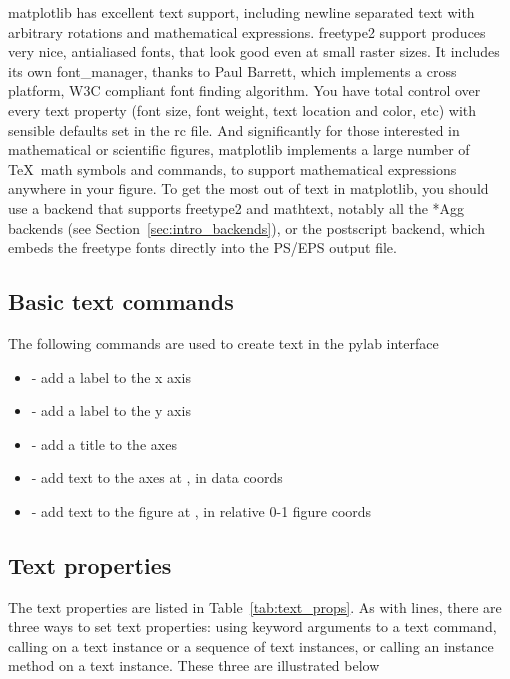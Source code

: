\documentclass[twoside]{book}
\begin{document}
matplotlib has excellent text support, including newline separated
text with arbitrary rotations and mathematical expressions.  freetype2
support produces very nice, antialiased fonts, that look good even at
small raster sizes.  It includes its own font\_manager, thanks to Paul
Barrett, which implements a cross platform, W3C compliant font finding
algorithm.  You have total control over every text property (font
size, font weight, text location and color, etc) with sensible
defaults set in the rc file.  And significantly for those interested
in mathematical or scientific figures, matplotlib implements a large
number of \TeX\ math symbols and commands, to support mathematical
expressions anywhere in your figure.  To get the most out of text in
matplotlib, you should use a backend that supports freetype2 and
mathtext, notably all the *Agg backends (see
Section~\ref{sec:intro_backends}), or the postscript backend, which
embeds the freetype fonts directly into the PS/EPS output file.

\subsection{Basic text commands}
\label{sec:basic_text}

The following commands are used to create text in the pylab
interface

\begin{itemize}
  \item {} - add a label  to the x axis
  \item {} - add a label  to the y axis
  \item {} - add a title  to the axes
  \item {} - add text  to the axes at
    ,  in data coords
  \item {} - add text to the figure at ,
     in relative 0-1 figure coords
\end{itemize}



\subsection{Text properties}
\label{sec:text_props}

The text properties are listed in Table~\ref{tab:text_props}.  As with
lines, there are three ways to set text properties: using keyword
arguments to a text command, calling  on a text instance or
a sequence of text instances, or calling an instance method on a text
instance.  These three are illustrated below
\end{document}
